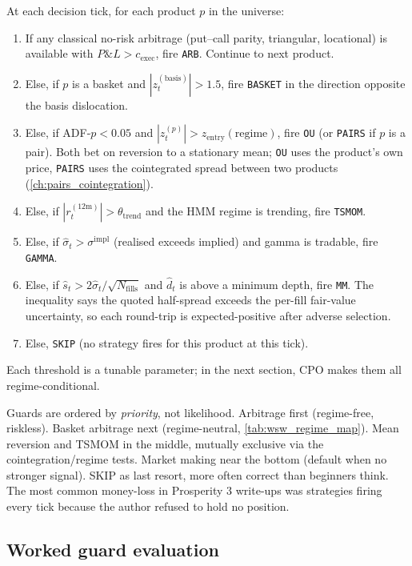 \begin{keyfactbox}
At each decision tick, for each product $p$ in the universe:
\begin{enumerate}
  \item If any classical no-risk arbitrage (put--call parity,
  triangular, locational) is available with $P\&L > c_{\text{exec}}$,
  fire \texttt{ARB}. Continue to next product.
  \item Else, if $p$ is a basket and
  $|z_t^{(\mathrm{basis})}| > 1.5$, fire \texttt{BASKET} in the
  direction opposite the basis dislocation.
  \item Else, if ADF-$p < 0.05$ and
  $|z_t^{(p)}| > z_{\text{entry}}(\text{regime})$, fire
  \texttt{OU} (or \texttt{PAIRS} if $p$ is a pair). Both bet on
  reversion to a stationary mean; \texttt{OU} uses the product's
  own price, \texttt{PAIRS} uses the cointegrated spread between
  two products (\cref{ch:pairs_cointegration}).
  \item Else, if $|r_t^{(12\mathrm{m})}| > \theta_{\text{trend}}$
  and the HMM regime is trending, fire \texttt{TSMOM}.
  \item Else, if $\hat{\sigma}_t > \sigma^{\mathrm{impl}}$
  (realised exceeds implied) and gamma is tradable, fire
  \texttt{GAMMA}.
  \item Else, if $\hat{s}_t > 2 \hat{\sigma}_t/\sqrt{N_{\text{fills}}}$
  and $\hat{d}_t$ is above a minimum depth, fire \texttt{MM}.
  The inequality says the quoted half-spread exceeds the
  per-fill fair-value uncertainty, so each round-trip is
  expected-positive after adverse selection.
  \item Else, \texttt{SKIP} (no strategy fires for this product
  at this tick).
\end{enumerate}
Each threshold is a tunable parameter; in the next section,
CPO makes them all regime-conditional.
\end{keyfactbox}

Guards are ordered by \emph{priority}, not likelihood. Arbitrage
first (regime-free, riskless). Basket arbitrage next
(regime-neutral, \cref{tab:wsw_regime_map}). Mean reversion and
TSMOM in the middle, mutually exclusive via the
cointegration/regime tests. Market making near the bottom (default
when no stronger signal). SKIP as last resort, more often
correct than beginners think. The most common money-loss in
Prosperity 3 write-ups was strategies firing every tick because the
author refused to hold no position.

\subsection{Worked guard evaluation}
\label{subsec:wsw_guard_eval}

